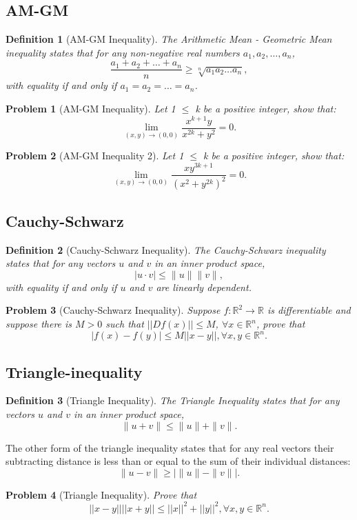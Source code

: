 \documentclass{article}
\newtheorem{definition}{Definition}
\newtheorem{problem}{Problem}
\begin{document}
\subsection{AM-GM}
\begin{definition}[AM-GM Inequality]
    The Arithmetic Mean - Geometric Mean inequality states that for any non-negative real numbers \(a_1, a_2, \ldots, a_n\),
    \[\frac{a_1 + a_2 + \ldots + a_n}{n} \geq \sqrt[n]{a_1 a_2 \ldots a_n},\]
    with equality if and only if \(a_1 = a_2 = \ldots = a_n\).
\end{definition}

\begin{problem}[AM-GM Inequality]
    Let 1 $\leq$ k be a positive integer, show that:
    \[\lim_{(x,y)\to(0,0)}\frac{x^{k+1}y}{x^{2k} + y^2} = 0.\]
\end{problem}
\begin{problem}[AM-GM Inequality 2]
    Let 1 $\leq$ k be a positive integer, show that:
    \[\lim_{(x,y)\to(0,0)}\frac{xy^{3k+1}}{(x^2 + y^{2k})^2} = 0.\]
\end{problem}

\subsection{Cauchy-Schwarz}
\begin{definition}[Cauchy-Schwarz Inequality]
    The Cauchy-Schwarz inequality states that for any vectors \(u\) and \(v\) in an inner product space,
    \[|u \cdot v| \leq \|u\| \|v\|,\]
    with equality if and only if \(u\) and \(v\) are linearly dependent.
\end{definition}
\begin{problem}[Cauchy-Schwarz Inequality]
    Suppose \(f : \mathbb{R}^2 \to \mathbb{R} \) is differentiable and suppose there is \(M > 0 \) such that \(||Df(x)|| \leq M\), \(\forall x \in \mathbb{R}^n\), prove that
    \[|f(x) - f(y)| \leq M||x - y||, \forall x,y \in \mathbb{R}^n.\]
\end{problem}

\subsection{Triangle-inequality}
\begin{definition}[Triangle Inequality]
    The Triangle Inequality states that for any vectors \(u\) and \(v\) in an inner product space,
    \[\|u + v\| \leq \|u\| + \|v\|.\]
\end{definition}
The other form of the triangle inequality states that for any real vectors their subtracting distance is less than or equal to the sum of their individual distances:
\[\|u - v\| \geq |\|u\| - \|v\||.\]
\begin{problem}[Triangle Inequality]
    Prove that 
    \[||x - y||||x + y|| \leq ||x||^2 + ||y||^2, \forall x,y \in \mathbb{R}^n.\]
\end{problem}
\end{document}
